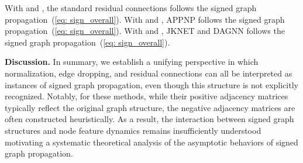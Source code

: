 \begin{theorem}
With  and , the standard residual connections follows the signed graph propagation~(\ref{eq: sign_overall}).
With  and , APPNP follows the signed graph propagation~(\ref{eq: sign_overall}).
    With  and , JKNET and DAGNN follows the signed graph propagation~(\ref{eq: sign_overall}).
\end{theorem}
\endgroup

\textbf{Discussion.} In summary, we establish a unifying perspective in which normalization, edge dropping, and residual connections can all be interpreted as instances of signed graph propagation, even though this structure is not explicitly recognized. Notably, for these methods, while their positive adjacency matrices typically reflect the original graph structure, the negative adjacency matrices are often constructed heuristically. As a result, the interaction between signed graph structures and node feature dynamics remains insufficiently understood motivating a systematic theoretical analysis of the asymptotic behaviors of signed graph propagation.
%